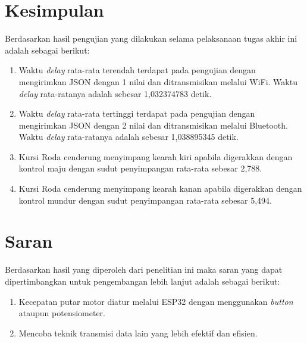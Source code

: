 \section{Kesimpulan}
\label{sec:kesimpulan}

Berdasarkan hasil pengujian yang dilakukan selama pelaksanaan tugas akhir ini adalah sebagai berikut:

\begin{enumerate}

  \item Waktu \emph{delay} rata-rata terendah terdapat pada pengujian dengan mengirimkan JSON dengan 1 nilai dan ditransmisikan melalui WiFi. Waktu \emph{delay} rata-ratanya adalah sebesar 1,032374783 detik.

  \item Waktu \emph{delay} rata-rata tertinggi terdapat pada pengujian dengan mengirimkan JSON dengan 2 nilai dan ditransmisikan melalui Bluetooth. Waktu \emph{delay} rata-ratanya adalah sebesar 1,038895345 detik. 
  
  \item Kursi Roda cenderung menyimpang kearah kiri apabila digerakkan dengan kontrol maju dengan sudut penyimpangan rata-rata sebesar 2,788\textdegree.
  
  \item Kursi Roda cenderung menyimpang kearah kanan apabila digerakkan dengan kontrol mundur dengan sudut penyimpangan rata-rata sebesar 5,494\textdegree.

\end{enumerate}

\section{Saran}
\label{chap:saran}

Berdasarkan hasil yang diperoleh dari penelitian ini maka saran yang dapat dipertimbangkan untuk pengembangan lebih lanjut adalah sebagai berikut:

\begin{enumerate}

  \item Kecepatan putar motor diatur melalui ESP32 dengan menggunakan \emph{button} ataupun potensiometer.

  \item Mencoba teknik transmisi data lain yang lebih efektif dan efisien.

\end{enumerate}
